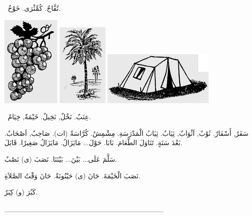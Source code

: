 \documentclass[a5paper]{article}
\begin{document}
\ تُفَّاحٌ. كُمَّثْرَى. خَوْخٌ. 

 \includegraphics[width=1.1252in,height=1.7709in]{images/MuhammadBagauddinprettified-img137.png}   \includegraphics[width=0.9791in,height=1.6146in]{images/MuhammadBagauddinprettified-img138.png}   \includegraphics[width=2.1563in,height=1.0417in]{images/MuhammadBagauddinprettified-img139.png} 

\ عِنَبٌ. نَخْلٌ, نَخِيلٌ. خَيْمَةٌ, خِيَامٌ. 

سَفَرٌ, أَسْفَارٌ. ثَوْبٌ, اَثْوَابٌ, ثِيَابٌ. ثِيَابُ الْمَدْرَسَةِ. مِشْمِشٌ. كُرَّاسَةٌ (ات). صَاحِبٌ, اَصْحَابٌ. بَعْدَ سَنَةٍ. تَنَاوَلَ الطَّعَامَ. بَابَا. حَوْلَ... مَايَزَالُ. مَايَزَالُ صَغِيرًا. قَابَلَ. 

سَلَّمَ عَلَى... بَيْنَ... بَيْنَنَا. نَصَبَ (ى) نَصْبٌ. 

نَصَبَ الْخَيْمَةَ. حَانَ (ى) حَيْنُونَةٌ. حَانَ وَقْتُ الصَّلاَةِ. 

كَبُرَ (و) كِبَرٌ.

\_\_\_\_\_\_\_\_\_\_\_\_\_\_\_\_\_\_\_\_\_\_\_\_\_\_\_\_\_\_\_
\end{document}
